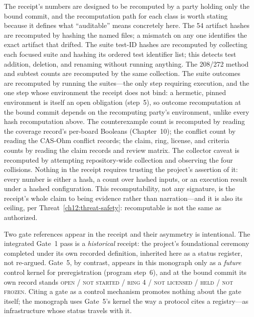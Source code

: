 The receipt's numbers are designed to be recomputed by a party holding only the bound commit, and the recomputation path for each class is worth stating because it defines what ``auditable'' means concretely here. The 54 artifact hashes are recomputed by hashing the named files; a mismatch on any one identifies the exact artifact that drifted. The suite test-ID hashes are recomputed by collecting each focused suite and hashing its ordered test identifier list; this detects test addition, deletion, and renaming without running anything. The 208/272 method and subtest counts are recomputed by the same collection. The suite outcomes are recomputed by running the suites---the only step requiring execution, and the one step whose environment the receipt does not bind: a hermetic, pinned environment is itself an open obligation (step~5), so outcome recomputation at the bound commit depends on the recomputing party's environment, unlike every hash recomputation above. The counterexample count is recomputed by reading the coverage record's per-board Booleans (Chapter~10); the conflict count by reading the CAS-Ohm conflict records; the claim, ring, license, and criteria counts by reading the claim records and review matrix. The collector caveat is recomputed by attempting repository-wide collection and observing the four collisions. Nothing in the receipt requires trusting the project's assertion of it: every number is either a hash, a count over hashed inputs, or an execution result under a hashed configuration. This recomputability, not any signature, is the receipt's whole claim to being evidence rather than narration---and it is also its ceiling, per Threat~\ref{ch12:threat-safety}: recomputable is not the same as authorized.

\begin{remark}\label{ch12:rem-gates}
Two gate references appear in the receipt and their asymmetry is intentional. The integrated Gate~1 pass is a \emph{historical} receipt: the project's foundational ceremony completed under its own recorded definition, inherited here as a status register, not re-argued. Gate~5, by contrast, appears in this monograph only as a \emph{future} control kernel for preregistration (program step~6), and at the bound commit its own record stands \textsc{open / not started / ring 4 / not licensed / held / not frozen}. Citing a gate as a control mechanism promotes nothing about the gate itself; the monograph uses Gate~5's kernel the way a protocol cites a registry---as infrastructure whose status travels with it.
\end{remark}

